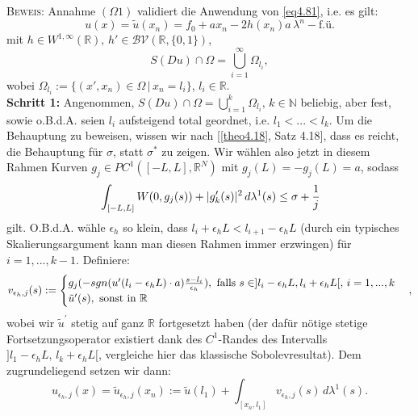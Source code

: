 \textsc{Beweis:} Annahme \((\Omega1)\) validiert die Anwendung von \eqref{eq4.81}, i.e. es gilt:
\begin{equation}
    u(x) = \tilde{u}(x_n) = f_0 + a x_n - 2h(x_n)a \, \lambda^n-\text{f.ü.}
\end{equation}
mit \(h \in W^{1,\infty}(\mathbb{R}), \, h' \in \mathcal{BV}(\mathbb{R},\{0,1\})\),
\begin{equation}
    S(Du) \cap \Omega = \bigcup_{i=1}^{\infty} \Omega_{l_i},
\end{equation}
wobei \(\Omega_{l_i} := \{(x',x_n) \in \Omega \, | \, x_n = l_i\}\), \(l_i \in \mathbb{R}\).\\
\textbf{Schritt 1:} Angenommen, \(S(Du) \cap \Omega = \bigcup_{i=1}^k \Omega_{l_i}, \, k \in \mathbb{N}\) beliebig, aber fest, sowie o.B.d.A. seien \(l_i\) aufsteigend total geordnet, i.e. \(l_1 < ... < l_k\). Um die Behauptung zu beweisen, wissen wir nach [\ref{theo4.18}, Satz 4.18], dass es reicht, die Behauptung für \(\sigma\), statt \(\sigma^*\) zu zeigen. Wir wählen also jetzt in diesem Rahmen Kurven \(g_j \in PC^1([-L,L],\mathbb{R}^N)\) mit \(g_j(L) = -g_j(L) = a\), sodass
    \begin{equation}{\label{eq4.120}}
        \int_{[-L,L]} W(0,g_j(s)) + |g^{\prime}_k(s)|^2 \,d\lambda^1(s) \leq \sigma + \frac{1}{j}
    \end{equation}
    gilt. O.B.d.A. wähle \(\epsilon_h\) so klein, dass \(l_i + \epsilon_h L < l_{i+1} - \epsilon_h L\) (durch ein typisches Skalierungsargument kann man diesen Rahmen immer erzwingen) für \(i=1,...,k-1\). Definiere:
    \begin{equation}{\label{eq4.121}}
        v_{\epsilon_h,j}(s) := \begin{cases}
            g_j(-sgn(u^{\prime}(l_i - \epsilon_h L) \cdot a) \frac{s-l_i}{\epsilon_h}), \text{ falls } s \in ]l_i - \epsilon_h L, l_i + \epsilon_h L[, \, i=1,...,k \\
            \tilde{u}^{\prime}(s), \text{ sonst in }\mathbb{R}
        \end{cases},
    \end{equation}
    wobei wir \(\tilde{u}^{\prime}\) stetig auf ganz \(\mathbb{R}\) fortgesetzt haben (der dafür nötige stetige Fortsetzungsoperator existiert dank des \(C^1\)-Randes des Intervalls \(]l_1- \epsilon_h L, \, l_k + \epsilon_h L[\), vergleiche hier das klassische Sobolevresultat). Dem zugrundeliegend setzen wir dann:
    \begin{equation}
        u_{\epsilon_h,j}(x) = \tilde{u}_{\epsilon_h,j} (x_n) := \tilde{u}(l_1) + \int_{[x_n,l_1]} v_{\epsilon_h,j}(s) \,d\lambda^1(s).
    \end{equation}
